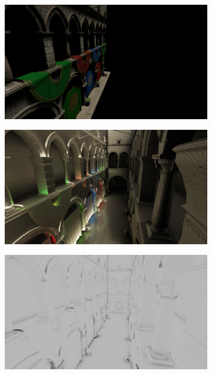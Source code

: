 \begin{figure}[H]
	\centering
	\begin{subfigure}[t]{.49\linewidth}
		\centering
		\captionsetup{justification=centering}
		\includegraphics[width=\linewidth]{media/finals/sponza_direct.png}
	\end{subfigure}%
	\hspace{0.01\textwidth}
	\begin{subfigure}[t]{.49\linewidth}
		\centering
		\captionsetup{justification=centering}
		\includegraphics[width=\linewidth]{media/finals/sponza_indirect.png}
	\end{subfigure}%
	\par\smallskip
	\begin{subfigure}[t]{.49\linewidth}
		\centering
		\captionsetup{justification=centering}
		\includegraphics[width=\linewidth]{media/finals/sponza_ao.png}

\end{subfigure}
\end{figure}

